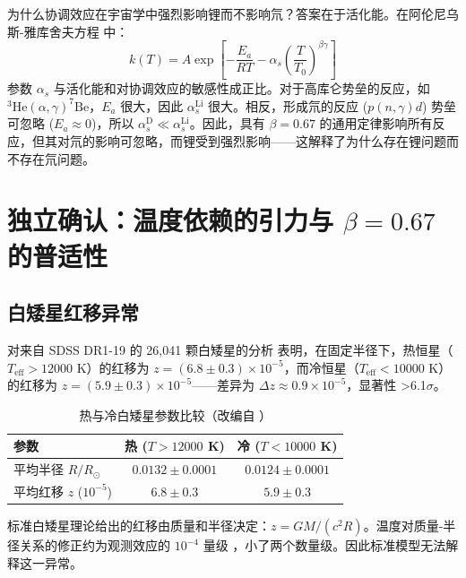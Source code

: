 \documentclass[12pt,a4paper]{article}
\theoremstyle{remark}
\newcommand{\alp}{\alpha}
\begin{document}
	为什么协调效应在宇宙学中强烈影响锂而不影响氘？答案在于活化能。在阿伦尼乌斯-雅库舍夫方程 \cite{appendixC} 中：
	\begin{equation}
		k(T) = A \exp\left[-\frac{E_a}{RT} - \alp_s \left(\frac{T}{T_0}\right)^{\beta\gamma}\right]
		\label{eq:arrhenius_yak}
	\end{equation}
	参数 \(\alp_s\) 与活化能和对协调效应的敏感性成正比。对于高库仑势垒的反应，如 \(^3\mathrm{He}(\alpha,\gamma)^7\mathrm{Be}\)，\(E_a\) 很大，因此 \(\alp_s^{\mathrm{Li}}\) 很大。相反，形成氘的反应 (\(p(n,\gamma)d\)) 势垒可忽略 (\(E_a \approx 0\))，所以 \(\alp_s^{\mathrm{D}} \ll \alp_s^{\mathrm{Li}}\)。因此，具有 \(\beta = 0.67\) 的通用定律影响所有反应，但其对氘的影响可忽略，而锂受到强烈影响——这解释了为什么存在锂问题而不存在氘问题。
	
	\section{独立确认：温度依赖的引力与 \(\beta = 0.67\) 的普适性}
	\label{sec:universal-proof}
	
	\subsection{白矮星红移异常}
	\label{subsec:wd-anomaly}
	
	对来自 SDSS DR1-19 的 26,041 颗白矮星的分析 \cite{Crumpler2024} 表明，在固定半径下，热恒星（\(T_{\mathrm{eff}} > 12000\) K）的红移为 \(z = (6.8 \pm 0.3) \times 10^{-5}\)，而冷恒星（\(T_{\mathrm{eff}} < 10000\) K）的红移为 \(z = (5.9 \pm 0.3) \times 10^{-5}\)——差异为 \(\Delta z \approx 0.9 \times 10^{-5}\)，显著性 >6.1\(\sigma\)。
	
	\begin{table}[h]
		\centering
		\caption{热与冷白矮星参数比较（改编自 \cite{Crumpler2024}）}
		\label{tab:wd-results}
		\begin{tabular}{lcc}
			\toprule
			\textbf{参数} & \textbf{热 (\(T>12000\) K)} & \textbf{冷 (\(T<10000\) K)} \\
			\midrule
			平均半径 \(R/R_\odot\) & \(0.0132 \pm 0.0001\) & \(0.0124 \pm 0.0001\) \\
			平均红移 \(z\) (\(10^{-5}\)) & \(6.8 \pm 0.3\) & \(5.9 \pm 0.3\) \\
			\bottomrule
		\end{tabular}
	\end{table}
	
	标准白矮星理论给出的红移由质量和半径决定：\(z = GM/(c^2 R)\)。温度对质量-半径关系的修正约为观测效应的 \(10^{-4}\) 量级 \cite{Fontaine2001}，小了两个数量级。因此标准模型无法解释这一异常。
	
\end{document}

